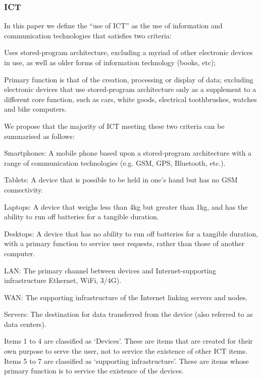 \documentclass[conference]{IEEEtran}
\begin{document}
\subsubsection{ICT}

In this paper we define the ``use of ICT'' as the use of information and
communication technologies that satisfies two criteria:

\begin{compactitem}
\item Uses stored-program architecture, excluding a myriad of other
  electronic devices in use, as well as older forms of information
  technology (books, etc);
\item Primary function is that of the creation, processing or display
  of data; excluding electronic devices that use stored-program
  architecture only as a supplement to a different core function, such
  as cars, white goods, electrical toothbrushes, watches and bike
  computers.
\end{compactitem}

We propose that the majority of ICT meeting these two criteria can be
summarised as follows:

\begin{compactenum}
\item Smartphones: A mobile phone based upon a stored-program
  architecture with a range of communication technologies (e.g. GSM, GPS,
  Bluetooth, etc.).
\item Tablets: A device that is possible to be held in one's hand but
  has no GSM connectivity.
\item Laptops: A device that weighs less than 4kg but greater
  than 1kg, and has the ability to run off batteries for a
  tangible duration.
\item Desktops: A device that has no ability to run off batteries for
  a tangible duration, with a primary function to service
  user requests, rather than those of another computer.
\item LAN: The primary channel between devices and Internet-supporting
  infrastructure Ethernet, WiFi, 3/4G).
\item WAN: The supporting infrastructure of the Internet linking
  servers and nodes.
\item Servers: The destination for data transferred from the device
  (also referred to as data centers).
\end{compactenum}

Items 1 to 4 are classified as `Devices'. These are items that are
created for their own purpose to serve the user, not to service the
existence of other ICT items. Items 5 to 7 are classified as
`supporting infrastructure'. These are items whose primary function is
to service the existence of the devices.
\end{document}
